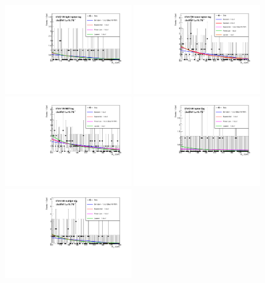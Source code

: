\begin{figure}
  \includegraphics[width=0.49\textwidth]{analysis/plots/multipdf_plots/cat8_8TeV.pdf}
  \includegraphics[width=0.49\textwidth]{analysis/plots/multipdf_plots/cat9_8TeV.pdf}\\
  \includegraphics[width=0.49\textwidth]{analysis/plots/multipdf_plots/cat10_8TeV.pdf}
  \includegraphics[width=0.49\textwidth]{analysis/plots/multipdf_plots/cat11_8TeV.pdf}\\
  \includegraphics[width=0.49\textwidth]{analysis/plots/multipdf_plots/cat12_8TeV.pdf}

\end{figure}
